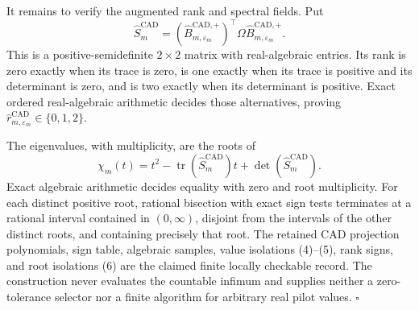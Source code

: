 It remains to verify the augmented rank and spectral fields.  Put
\[
\widehat S_m^{\mathrm{CAD}}
=(\widehat B_{m,\varepsilon_m}^{\mathrm{CAD},+})^{\top}
\Omega\widehat B_{m,\varepsilon_m}^{\mathrm{CAD},+}.
\]
This is a positive-semidefinite \(2\times2\) matrix with real-algebraic entries.  Its rank is zero exactly when its trace is zero, is one exactly when its trace is positive and its determinant is zero, and is two exactly when its determinant is positive.  Exact ordered real-algebraic arithmetic decides those alternatives, proving \(\widehat r_{m,\varepsilon_m}^{\mathrm{CAD}}\in\{0,1,2\}\).

The eigenvalues, with multiplicity, are the roots of
\[
\chi_m(t)=t^2-\operatorname{tr}(\widehat S_m^{\mathrm{CAD}})t
+\det(\widehat S_m^{\mathrm{CAD}}).
\tag{6}
\]
Exact algebraic arithmetic decides equality with zero and root multiplicity.  For each distinct positive root, rational bisection with exact sign tests terminates at a rational interval contained in \((0,\infty)\), disjoint from the intervals of the other distinct roots, and containing precisely that root.  The retained CAD projection polynomials, sign table, algebraic samples, value isolations (4)--(5), rank signs, and root isolations (6) are the claimed finite locally checkable record.  The construction never evaluates the countable infimum and supplies neither a zero-tolerance selector nor a finite algorithm for arbitrary real pilot values. \(\square\)